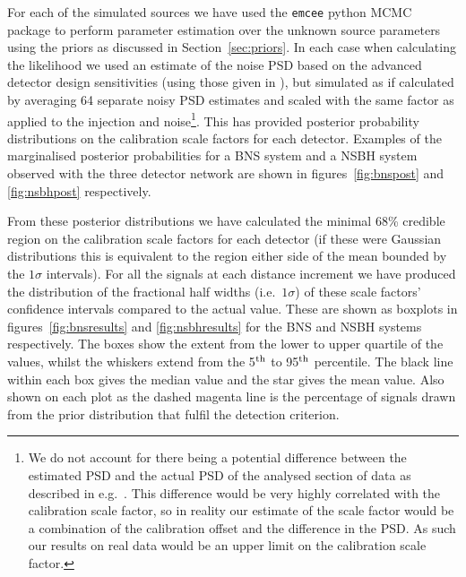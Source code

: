 \documentclass[10pt]{iopart}
\begin{document}
For each of the simulated sources we have used the {\tt emcee} python \ac{MCMC} package 
\cite{2013PASP..125..306F} to perform parameter estimation over the unknown source parameters using 
the priors as discussed in Section~\ref{sec:priors}. In each case when calculating the likelihood 
we used an estimate of the noise \ac{PSD} based on the advanced detector design sensitivities 
(using those given in \cite{2013arXiv1304.0670L}), but simulated as if calculated by averaging 64 
separate noisy \ac{PSD} estimates and scaled with the same factor as applied to the injection and 
noise\footnote{We do not account for there being a potential difference between the estimated 
\ac{PSD} and the actual \ac{PSD} of the analysed section of data as described in e.g.\ 
\cite{2013PhRvD..88h4044L}. This difference would be very highly correlated with the calibration 
scale factor, so in reality our estimate of the scale factor would be a combination of the
calibration offset and the difference in the \ac{PSD}. As such our results on real data would be an 
upper limit on the calibration scale factor.}. This has provided posterior probability distributions 
on the calibration scale factors for each detector. Examples of the marginalised posterior 
probabilities for a \ac{BNS} system and a \ac{NSBH} system observed with the three detector network 
are shown in figures~\ref{fig:bnspost} and \ref{fig:nsbhpost} respectively.

From these posterior distributions we have calculated the minimal 68\% credible region on the 
calibration scale factors for each detector (if these were Gaussian distributions this is 
equivalent to the region either side of the mean bounded by the $1\sigma$ intervals). For all the 
signals at each distance increment we have produced the distribution of the fractional half widths 
(i.e.\ $1\sigma$) of these scale factors' confidence intervals compared to the actual value. These 
are shown as boxplots in figures~\ref{fig:bnsresults} and \ref{fig:nsbhresults} for the \ac{BNS} 
and \ac{NSBH} systems respectively. The boxes show the extent from the lower to upper quartile of 
the values, whilst the whiskers extend from the 5$^{\rm th}$ to 95$^{\rm th}$ percentile. The black 
line within each box gives the median value and the star gives the mean value. Also shown on each 
plot as the dashed magenta line is the percentage of signals drawn from the prior distribution that 
fulfil the detection criterion.
\end{document}
